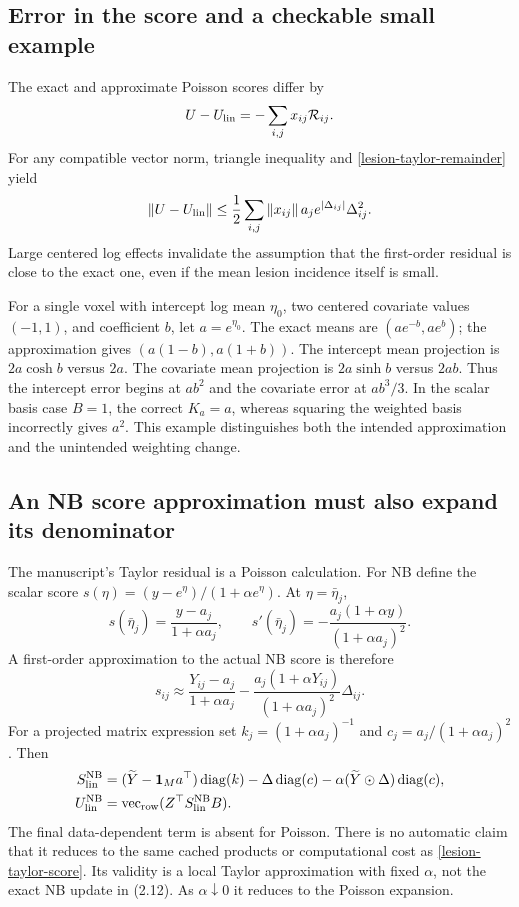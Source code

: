 \documentclass[11pt,a4paper]{article}
\newcommand{\diag}{\operatorname{diag}}
\newcommand{\vr}{\operatorname{vec}_{\rm row}}
\numberwithin{equation}{section}
\begin{document}
\subsection{Error in the score and a checkable small example}
The exact and approximate Poisson scores differ by
\[
 U-U_{\rm lin}=-\sum_{i,j}x_{ij}\mathcal R_{ij}.
\]
For any compatible vector norm, triangle inequality and
\eqref{lesion-taylor-remainder} yield
\[
 \|U-U_{\rm lin}\|
 \le\frac12\sum_{i,j}\|x_{ij}\|\,a_j
                           e^{|\Delta_{ij}|}\Delta_{ij}^2.
\]
Large centered log effects invalidate the assumption that the
first-order residual is close to the exact one, even if the
mean lesion incidence itself is small.

For a single voxel with intercept log mean $\eta_0$, two centered
covariate values $(-1,1)$, and coefficient $b$, let $a=e^{\eta_0}$.
The exact means are $(ae^{-b},ae^b)$; the approximation gives
$(a(1-b),a(1+b))$.
The intercept mean projection is $2a\cosh b$ versus $2a$.
The covariate mean projection is $2a\sinh b$ versus $2ab$.
Thus the intercept error begins at $ab^2$ and the covariate error
at $ab^3/3$. In the scalar basis case $B=1$, the correct
$K_a=a$, whereas squaring the weighted basis incorrectly gives $a^2$.
This example distinguishes both the intended approximation and the
unintended weighting change.

\subsection{An NB score approximation must also expand its denominator}
The manuscript's Taylor residual is a Poisson calculation.
For NB define the scalar score
$s(\eta)=(y-e^\eta)/(1+\alpha e^\eta)$.
At $\eta=\bar\eta_j$,
\[
 s(\bar\eta_j)=\frac{y-a_j}{1+\alpha a_j},\qquad
 s'(\bar\eta_j)=-\frac{a_j(1+\alpha y)}{(1+\alpha a_j)^2}.
\]
A first-order approximation to the actual NB score is therefore
\begin{equation}
 s_{ij}\approx
 \frac{Y_{ij}-a_j}{1+\alpha a_j}
 -\frac{a_j(1+\alpha Y_{ij})}{(1+\alpha a_j)^2}\Delta_{ij}.
 \label{lesion-nb-taylor}
\end{equation}
For a projected matrix expression set
$k_j=(1+\alpha a_j)^{-1}$ and
$c_j=a_j/(1+\alpha a_j)^2$. Then
\begin{align}
 S_{\rm lin}^{\rm NB}
 &=(\widetilde Y-\mathbf1_Ma^\top)\diag(k)
       -\Delta\diag(c)-\alpha(\widetilde Y\mathbin{\odot}\Delta)\diag(c),\\
 U_{\rm lin}^{\rm NB}&=\vr(Z^\top S_{\rm lin}^{\rm NB}B).
\end{align}
The final data-dependent term is absent for Poisson.
There is no automatic claim that it reduces to the same cached
products or computational cost as \eqref{lesion-taylor-score}.
Its validity is a local Taylor approximation with fixed $\alpha$,
not the exact NB update in (2.12).
As $\alpha\downarrow0$ it reduces to the Poisson expansion.
\end{document}
